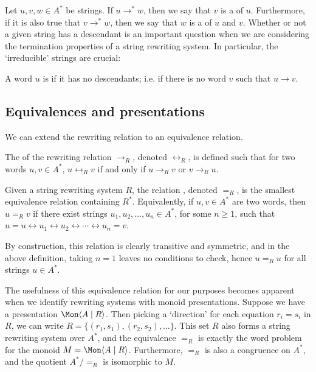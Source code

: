 \documentclass[noindex,noinsetproof,emphthm,12pt]{lmaths}
\begin{document}
Let $u, v, w \in A^*$ be strings. If $u \to^* w$, then we say that $v$ is a  of $u$. Furthermore, if it is also true that $v \to^* w$, then we say that $w$ is a  of $u$ and $v$. Whether or not a given string has a descendant is an important question when we are considering the termination properties of a string rewriting system. In particular, the `irreducible' strings are crucial:

\begin{defn}
	A word $u$ is  if it has no descendants; i.e. if there is no word $v$ such that $u \to v$.
\end{defn}

\subsection{Equivalences and presentations}

We can extend the rewriting relation to an equivalence relation.

\begin{defn}
	The  of the rewriting relation $\to_R$, denoted $\leftrightarrow_R$, is defined such that for two words $u, v \in A^*$, $u \leftrightarrow_R v$ if and only if $u \to_R v$ or $v \to_R u$.
\end{defn}

\begin{defn}
	Given a string rewriting system $R$, the relation , denoted $=_R$, is the smallest equivalence relation containing $R^*$. Equivalently, if $u, v \in A^*$ are two words, then $u =_R v$ if there exist strings $u_1, u_2, \ldots, u_n \in A^*$, for some $n \ge 1$, such that $u = u \leftrightarrow u_1 \leftrightarrow u_2 \leftrightarrow \cdots \leftrightarrow u_n = v$.
\end{defn}

By construction, this relation is clearly transitive and symmetric, and in the above definition, taking $n = 1$ leaves no conditions to check, hence $u =_R u$ for all strings $u \in A^*$.

\label{sec:rws-presentations} The usefulness of this equivalence relation for our purposes becomes apparent when we identify rewriting systems with monoid presentations. Suppose we have a presentation $\Mon \langle A \mid R\rangle$. Then picking a `direction' for each equation $r_i = s_i$ in $R$, we can write $R = \{ (r_1, s_1), (r_2, s_2), \ldots \}$. This set $R$ also forms a string rewriting system over $A^*$, and the equivalence $=_R$ is exactly the word problem for the monoid $M = \Mon \langle A \mid R\rangle$. Furthermore, $=_R$ is also a congruence on $A^*$, and the quotient $A^*/{=_R}$ is isomorphic to $M$.
\end{document}
